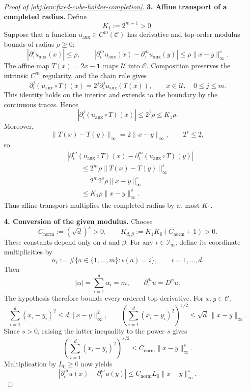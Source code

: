 \begin{proof}[Proof of \cref{obj:lem:fixed-cube-holder-completion}]
\textbf{3. Affine transport of a completed radius.}
Define
\[
K_1:=2^{m+1}>0.
\]
Suppose that a function \(u_{\mathrm{aux}}\in C^m(\mathscr C)\) has derivative and top-order modulus bounds of radius \(\rho\ge0\):
\[
|\partial_\iota^j u_{\mathrm{aux}}(x)|\le\rho,
\qquad
|\partial_\iota^m u_{\mathrm{aux}}(x)
-\partial_\iota^m u_{\mathrm{aux}}(y)|
\le\rho\|x-y\|_\infty^s.
\]
The affine map \(T(x)=2x-\mathbf1\) maps \(\mathscr U\) into \(\mathscr C\). Composition preserves the intrinsic \(C^m\) regularity, and the chain rule gives
\[
\partial_\iota^j(u_{\mathrm{aux}}\circ T)(x)
=
2^j\partial_\iota^j u_{\mathrm{aux}}(T(x)),
\qquad x\in\mathscr U,\quad 0\le j\le m.
\]
This identity holds on the interior and extends to the boundary by the continuous traces. Hence
\[
|\partial_\iota^j(u_{\mathrm{aux}}\circ T)(x)|
\le2^j\rho\le K_1\rho.
\]
Moreover,
\[
\|T(x)-T(y)\|_\infty=2\|x-y\|_\infty,
\qquad 2^s\le2,
\]
so
\[
\begin{aligned}
&|\partial_\iota^m(u_{\mathrm{aux}}\circ T)(x)
-\partial_\iota^m(u_{\mathrm{aux}}\circ T)(y)|\\
&\qquad\le
2^m\rho\|T(x)-T(y)\|_\infty^s\\
&\qquad=
2^m2^s\rho\|x-y\|_\infty^s\\
&\qquad\le
K_1\rho\|x-y\|_\infty^s.
\end{aligned}
\]
Thus affine transport multiplies the completed radius by at most \(K_1\).

\textbf{4. Conversion of the given modulus.}
Choose
\[
C_{\mathrm{norm}}:=(\sqrt d)^s>0,
\qquad
K_{d,\beta}:=K_1K_0(C_{\mathrm{norm}}+1)>0.
\]
These constants depend only on \(d\) and \(\beta\). For any
\(\iota\in\mathscr I_m\), define its coordinate multiplicities by
\[
\alpha_i:=\#\{a\in\{1,\ldots,m\}:\iota(a)=i\},
\qquad i=1,\ldots,d.
\]
Then
\[
|\alpha|=\sum_{i=1}^d\alpha_i=m,
\qquad
\partial_\iota^m u=D^\alpha u.
\]
The hypothesis therefore bounds every ordered top derivative. For \(x,y\in\mathscr C\),
\[
\sum_{i=1}^d(x_i-y_i)^2
\le d\|x-y\|_\infty^2,
\qquad
\left(\sum_{i=1}^d(x_i-y_i)^2\right)^{1/2}
\le\sqrt d\,\|x-y\|_\infty.
\]
Since \(s>0\), raising the latter inequality to the power \(s\) gives
\[
\left(\sum_{i=1}^d(x_i-y_i)^2\right)^{s/2}
\le C_{\mathrm{norm}}\|x-y\|_\infty^s.
\]
Multiplication by \(L_0\ge0\) now yields
\[
|\partial_\iota^m u(x)-\partial_\iota^m u(y)|
\le
C_{\mathrm{norm}}L_0\|x-y\|_\infty^s.
\]


\end{proof}
